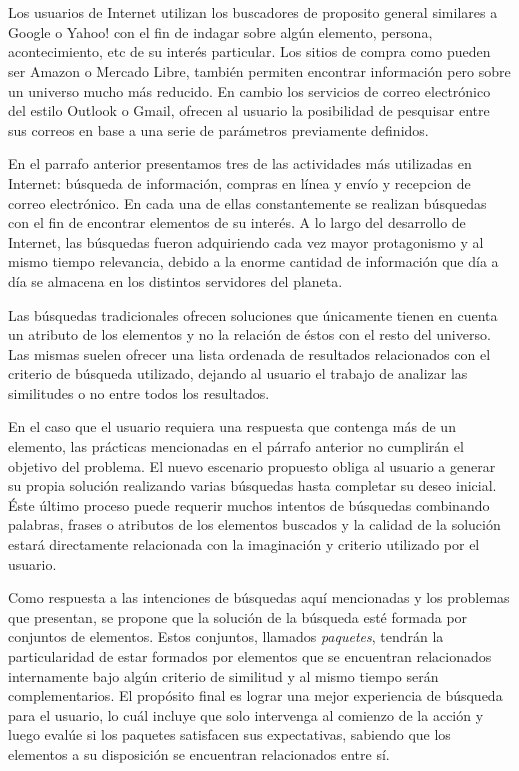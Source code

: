 \chapter*{\runtitulo}

\noindent 

Los usuarios de Internet utilizan los buscadores de proposito general similares a Google o Yahoo! con el fin de indagar sobre algún elemento, persona, acontecimiento, etc de su interés particular. Los sitios de compra como pueden ser Amazon o Mercado Libre, también permiten encontrar información pero sobre un universo mucho más reducido. En cambio los servicios de correo electrónico del estilo Outlook o Gmail, ofrecen al usuario la posibilidad de pesquisar entre sus correos en base a una serie de parámetros previamente definidos.

En el parrafo anterior presentamos tres de las actividades más utilizadas en Internet: búsqueda de información, compras en línea y envío y recepcion de correo electrónico. En cada una de ellas constantemente se realizan búsquedas con el fin de encontrar elementos de su interés. A lo largo del desarrollo de Internet, las búsquedas fueron adquiriendo cada vez mayor protagonismo y al mismo tiempo relevancia, debido a la enorme cantidad de información que día a día se almacena en los distintos servidores del planeta.

Las búsquedas tradicionales ofrecen soluciones que únicamente tienen en cuenta un atributo de los elementos y no la relación de éstos con el resto del universo. Las mismas suelen ofrecer una lista ordenada de resultados relacionados con el criterio de búsqueda utilizado, dejando al usuario el trabajo de analizar las similitudes o no entre todos los resultados.

En el caso que el usuario requiera una respuesta que contenga más de un elemento, las prácticas mencionadas en el párrafo anterior no cumplirán el objetivo del problema. El nuevo escenario propuesto obliga al usuario a generar su propia solución realizando varias búsquedas hasta completar su deseo inicial. Éste último proceso puede requerir muchos intentos de búsquedas combinando palabras, frases o atributos de los elementos buscados y la calidad de la solución estará directamente relacionada con la imaginación y criterio utilizado por el usuario.

Como respuesta a las intenciones de búsquedas aquí mencionadas y los problemas que presentan, se propone que la solución de la búsqueda esté formada por conjuntos de elementos. Estos conjuntos, llamados {\em paquetes}, tendrán la particularidad de estar formados por elementos que se encuentran relacionados internamente bajo algún criterio de similitud y al mismo tiempo serán complementarios. El propósito final es lograr una mejor experiencia de búsqueda para el usuario, lo cuál incluye que solo intervenga al comienzo de la acción y luego evalúe si los paquetes satisfacen sus expectativas, sabiendo que los elementos a su disposición se encuentran relacionados entre sí.

